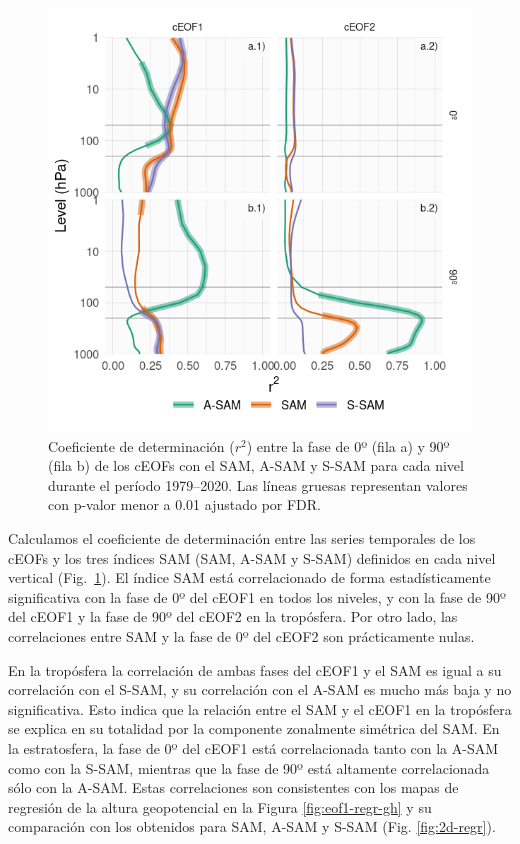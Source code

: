 \documentclass[12pt,oneside,a4paper]{reedthesis}
\begin{document}
\begin{figure}

{\centering \includegraphics{figures/30-sam/sam-eof-vertical-1} 

}

\caption{Coeficiente de determinación (\(r^2\)) entre la fase de 0º (fila a) y 90º (fila b) de los cEOFs con el SAM, A-SAM y S-SAM para cada nivel durante el período 1979--2020. Las líneas gruesas representan valores con p-valor menor a 0.01 ajustado por FDR.}\label{fig:sam-eof-vertical}
\end{figure}

Calculamos el coeficiente de determinación entre las series temporales de los cEOFs y los tres índices SAM (SAM, A-SAM y S-SAM) definidos en cada nivel vertical (Fig.~\ref{fig:sam-eof-vertical}).
El índice SAM está correlacionado de forma estadísticamente significativa con la fase de 0º del cEOF1 en todos los niveles, y con la fase de 90º del cEOF1 y la fase de 90º del cEOF2 en la tropósfera.
Por otro lado, las correlaciones entre SAM y la fase de 0º del cEOF2 son prácticamente nulas.

En la tropósfera la correlación de ambas fases del cEOF1 y el SAM es igual a su correlación con el S-SAM, y su correlación con el A-SAM es mucho más baja y no significativa.
Esto indica que la relación entre el SAM y el cEOF1 en la tropósfera se explica en su totalidad por la componente zonalmente simétrica del SAM.
En la estratosfera, la fase de 0º del cEOF1 está correlacionada tanto con la A-SAM como con la S-SAM, mientras que la fase de 90º está altamente correlacionada sólo con la A-SAM.
Estas correlaciones son consistentes con los mapas de regresión de la altura geopotencial en la Figura \ref{fig:eof1-regr-gh} y su comparación con los obtenidos para SAM, A-SAM y S-SAM (Fig. \ref{fig:2d-regr}).
\end{document}
